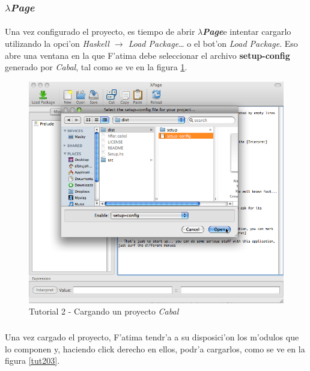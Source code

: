\documentclass[a4paper]{article}
\newcommand{\hpage}{\textbf{\textsl{$\lambda$Page}}}
\newcommand{\cabal}{\textsl{Cabal}}
\begin{document}
\subsubsection{\hpage}
\paragraph{}Una vez configurado el proyecto, es tiempo de abrir \hpage e intentar cargarlo utilizando la opci'on \textsl{Haskell $\rightarrow$ Load Package\ldots} o el bot'on \textsl{Load Package}.  Eso abre una ventana en la que F'atima debe seleccionar el archivo \textbf{setup-config} generado por \cabal, tal como se ve en la figura \ref{tut202}.
\begin{figure}[hp]
	\begin{center}
        	\includegraphics[width=.9\textwidth]{pictures/tut2/02}
		\caption{Tutorial 2 - Cargando un proyecto \cabal}
		\label{tut202}
	\end{center}
\end{figure}
\subparagraph{}Una vez cargado el proyecto, F'atima tendr'a a su disposici'on los m'odulos que lo componen y, haciendo click derecho en ellos, podr'a cargarlos, como se ve en la figura \ref{tut203}.
\end{document}
